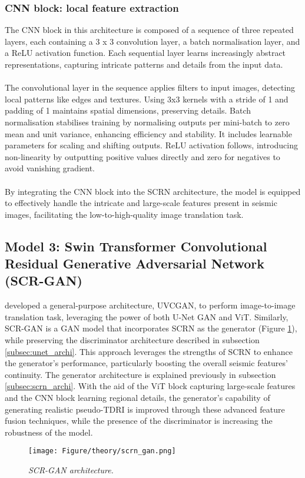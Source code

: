 \subsubsection{CNN block: local feature extraction}
The CNN block in this architecture is composed of a sequence of three repeated layers, each containing a 3 x 3 convolution layer, a batch normalisation layer, and a ReLU activation function. Each sequential layer learns increasingly abstract representations, capturing intricate patterns and details from the input data.
\\\\
The convolutional layer in the sequence applies filters to input images, detecting local patterns like edges and textures. Using 3x3 kernels with a stride of 1 and padding of 1 maintains spatial dimensions, preserving details. Batch normalisation stabilises training by normalising outputs per mini-batch to zero mean and unit variance, enhancing efficiency and stability. It includes learnable parameters for scaling and shifting outputs. ReLU activation follows, introducing non-linearity by outputting positive values directly and zero for negatives to avoid vanishing gradient.
\\\\
By integrating the CNN block into the SCRN architecture, the model is equipped to effectively handle the intricate and large-scale features present in seismic images, facilitating the low-to-high-quality image translation task.

\subsection{Model 3: Swin Transformer Convolutional Residual Generative Adversarial Network (SCR-GAN)}
 developed a general-purpose architecture, UVCGAN, to perform image-to-image translation task, leveraging the power of both U-Net GAN and ViT. Similarly, SCR-GAN is a GAN model that incorporates SCRN as the generator (Figure \ref{fig:scrngan_archi}), while preserving the discriminator architecture described in subsection \ref{subsec:unet_archi}. This approach leverages the strengths of SCRN to enhance the generator's performance, particularly boosting the overall seismic features' continuity. The generator architecture is explained previously in subsection \ref{subsec:scrn_archi}. With the aid of the ViT block capturing large-scale features and the CNN block learning regional details, the generator's capability of generating realistic pseudo-TDRI is improved through these advanced feature fusion techniques, while the presence of the discriminator is increasing the robustness of the model.

\begin{figure}[h]
	\centering
	\texttt{[image: Figure/theory/scrn\_gan.png]} %
	\caption{\textit{SCR-GAN architecture.}}
	\label{fig:scrngan_archi}
\end{figure}


